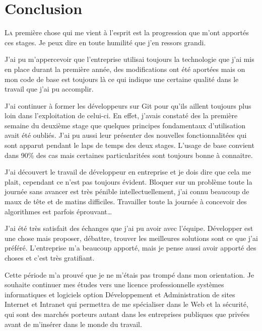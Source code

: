 \chapter{Conclusion} %
\label{cha:Conclusion}

\lettrine{L}{a} première chose qui me vient à l'esprit est la
progression que m'ont apportés ces stages. Je peux dire en toute
humilité que j'en ressors grandi.

J'ai pu m'appercevoir que l'entreprise utilisai toujours la technologie
que j'ai mis en place durant la première année, des modifications ont
été aportées mais on mon code de base est toujours là ce qui indique une
certaine qualité dans le travail que j'ai pu accomplir.

J'ai continuer à former les développeurs sur Git pour qu'ils aillent
toujours plus loin dans l'exploitation de celui-ci. En effet, j'avais
constaté des la première semaine du deuxième stage que quelques
principes fondamentaux d'utilisation avait été oubliés. J'ai pu aussi
leur présenter des nouvelles fonctionnalitées qui sont apparut pendant
le laps de temps des deux stages. L'usage de base convient dans 90\%{}
des cas mais certaines particularitées sont toujours bonne à connaitre.

J'ai découvert le travail de développeur en entreprise et je dois dire
que cela me plait, cependant ce n'est pas toujours évident.  Bloquer sur
un problème toute la journée sans avancer est très pénible
intellectuellement, j'ai connu beaucoup de maux de tête et de matins
difficiles. Travailler toute la journée à concevoir des algorithmes est
parfois éprouvant\dots

J'ai été très satisfait des échanges que j'ai pu avoir avec l'équipe.
Développer est une chose mais proposer, débattre, trouver les meilleures
solutions sont ce que j'ai préféré. L'entreprise m'a beaucoup apporté,
mais je pense aussi avoir apporté des choses et c'est très gratifiant.

Cette période m'a prouvé que je ne m'étais pas trompé dans mon
orientation. Je souhaite continuer mes études vers une licence
professionnelle systèmes informatiques et logiciels option \og
Développement et Administration de sites Internet et Intranet \fg{} qui
permettra de me spécialiser dans le Web et la sécurité, qui sont des
marchés porteurs autant dans les entreprises publiques que privées avant
de m'insérer dans le monde du travail.
